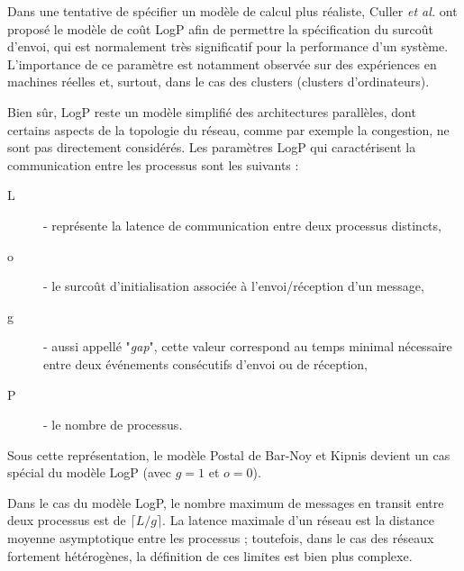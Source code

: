 %
Dans une tentative de spécifier un modèle de calcul plus réaliste,
Culler \emph{et al.} \cite{Culler96} ont proposé le modèle de coût
LogP afin de permettre la spécification du surcoût d'envoi, qui
est normalement très significatif pour la performance d'un système.
L'importance de ce paramètre est notamment observée sur des expériences
en machines réelles et, surtout, dans le cas des clusters (clusters d'ordinateurs). 


Bien sûr, LogP reste un modèle simplifié des architectures parallèles,
dont certains aspects de la topologie du réseau, comme par exemple
la congestion, ne sont pas directement considérés. Les paramètres LogP qui caractérisent
la communication entre les processus sont les suivants : 

\begin{description}
\item [{L}] - représente la latence de communication entre deux processus
distincts,
\item [{o}] - le surcoût d'initialisation associée à l'envoi/réception
d'un message,
\item [{g}] - aussi appellé "\textit{gap}", cette valeur correspond au temps minimal nécessaire entre deux événements consécutifs
d'envoi ou de réception,
\item [{P}] - le nombre de processus.
\end{description}
Sous cette représentation, le modèle Postal de Bar-Noy et Kipnis devient
un cas spécial du modèle LogP (avec $g=1$ et $o=0$). 

Dans le cas du modèle LogP, le nombre maximum de messages en transit
entre deux processus est de $\lceil L/g\rceil$. La latence maximale
d'un réseau est la distance moyenne asymptotique entre les processus
; toutefois, dans le cas des réseaux fortement hétérogènes, la définition
de ces limites est bien plus complexe. 

